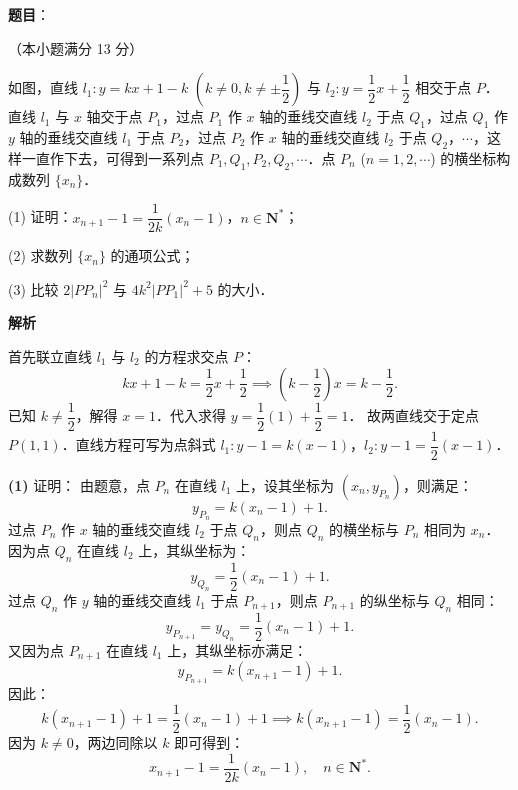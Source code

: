 \begin{answer}

\textbf{题目}：

（本小题满分 13 分）

如图，直线 $l_1: y = kx + 1 - k$ $\left(k \neq 0, k \neq \pm \dfrac{1}{2}\right)$ 与 $l_2: y = \dfrac{1}{2}x + \dfrac{1}{2}$ 相交于点 $P$．直线 $l_1$ 与 $x$ 轴交于点 $P_1$，过点 $P_1$ 作 $x$ 轴的垂线交直线 $l_2$ 于点 $Q_1$，过点 $Q_1$ 作 $y$ 轴的垂线交直线 $l_1$ 于点 $P_2$，过点 $P_2$ 作 $x$ 轴的垂线交直线 $l_2$ 于点 $Q_2$，$\cdots$，这样一直作下去，可得到一系列点 $P_1, Q_1, P_2, Q_2, \cdots$．点 $P_n$ ($n = 1, 2, \cdots$) 的横坐标构成数列 $\{x_n\}$．
\nopagebreak[4]
\begin{center}\end{center}
\nopagebreak[4]
(1) 证明：$x_{n+1} - 1 = \dfrac{1}{2k}(x_n - 1)$，$n \in \mathbf{N}^*$；

(2) 求数列 $\{x_n\}$ 的通项公式；

(3) 比较 $2|PP_n|^2$ 与 $4k^2|PP_1|^2 + 5$ 的大小．

\textbf{解析}
\nopagebreak[4]
\begin{center}\end{center}
\nopagebreak[4]
首先联立直线 $l_1$ 与 $l_2$ 的方程求交点 $P$：
\nopagebreak[4]
\[
kx + 1 - k = \frac{1}{2}x + \frac{1}{2} \implies \left(k - \frac{1}{2}\right)x = k - \frac{1}{2}.
\]
已知 $k \neq \dfrac{1}{2}$，解得 $x = 1$．代入求得 $y = \dfrac{1}{2}(1) + \dfrac{1}{2} = 1$．
故两直线交于定点 $P(1, 1)$．直线方程可写为点斜式 $l_1: y - 1 = k(x - 1)$，$l_2: y - 1 = \dfrac{1}{2}(x - 1)$．

\textbf{(1)} 证明：
由题意，点 $P_n$ 在直线 $l_1$ 上，设其坐标为 $(x_n, y_{P_n})$，则满足：
\nopagebreak[4]
\[
y_{P_n} = k(x_n - 1) + 1.
\]
过点 $P_n$ 作 $x$ 轴的垂线交直线 $l_2$ 于点 $Q_n$，则点 $Q_n$ 的横坐标与 $P_n$ 相同为 $x_n$．
因为点 $Q_n$ 在直线 $l_2$ 上，其纵坐标为：
\nopagebreak[4]
\[
y_{Q_n} = \frac{1}{2}(x_n - 1) + 1.
\]
过点 $Q_n$ 作 $y$ 轴的垂线交直线 $l_1$ 于点 $P_{n+1}$，则点 $P_{n+1}$ 的纵坐标与 $Q_n$ 相同：
\nopagebreak[4]
\[
y_{P_{n+1}} = y_{Q_n} = \frac{1}{2}(x_n - 1) + 1.
\]
又因为点 $P_{n+1}$ 在直线 $l_1$ 上，其纵坐标亦满足：
\nopagebreak[4]
\[
y_{P_{n+1}} = k(x_{n+1} - 1) + 1.
\]
因此：
\nopagebreak[4]
\[
k(x_{n+1} - 1) + 1 = \frac{1}{2}(x_n - 1) + 1 \implies k(x_{n+1} - 1) = \frac{1}{2}(x_n - 1).
\]
因为 $k \neq 0$，两边同除以 $k$ 即可得到：
\nopagebreak[4]
\[
x_{n+1} - 1 = \frac{1}{2k}(x_n - 1), \quad n \in \mathbf{N}^*.
\]


\end{answer}
